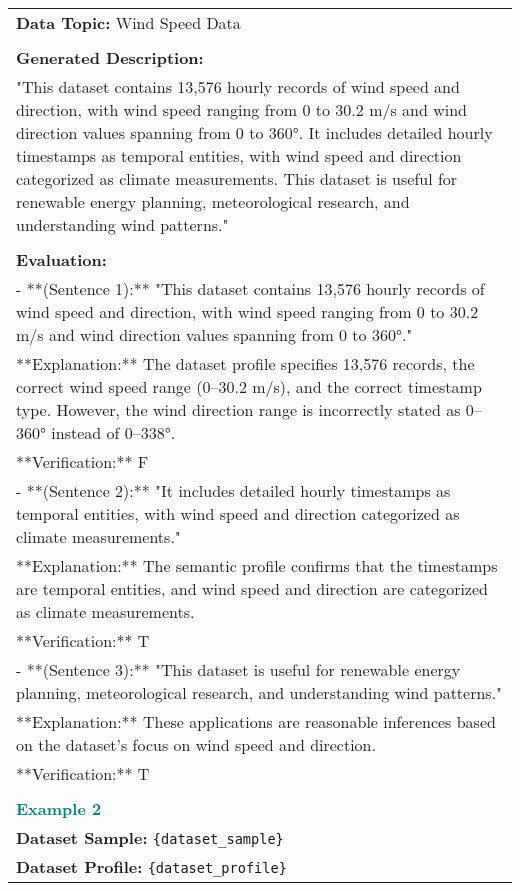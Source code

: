 \begin{table*}
\begin{tabular}{p{14cm}}
    \\
    \textbf{Data Topic:} Wind Speed Data \\
    \\
    \textbf{Generated Description:} \\
    "This dataset contains 13,576 hourly records of wind speed and direction, with wind speed ranging from 0 to 30.2 m/s and wind direction values spanning from 0 to 360°. It includes detailed hourly timestamps as temporal entities, with wind speed and direction categorized as climate measurements. This dataset is useful for renewable energy planning, meteorological research, and understanding wind patterns." \\
    \\
    \textbf{Evaluation:} \\
    - **(Sentence 1):** "This dataset contains 13,576 hourly records of wind speed and direction, with wind speed ranging from 0 to 30.2 m/s and wind direction values spanning from 0 to 360°." \\
      **Explanation:** The dataset profile specifies 13,576 records, the correct wind speed range (0–30.2 m/s), and the correct timestamp type. However, the wind direction range is incorrectly stated as 0–360° instead of 0–338°. \\
      **Verification:** F \\
    - **(Sentence 2):** "It includes detailed hourly timestamps as temporal entities, with wind speed and direction categorized as climate measurements." \\
      **Explanation:** The semantic profile confirms that the timestamps are temporal entities, and wind speed and direction are categorized as climate measurements. \\
      **Verification:** T \\
    - **(Sentence 3):** "This dataset is useful for renewable energy planning, meteorological research, and understanding wind patterns." \\
      **Explanation:** These applications are reasonable inferences based on the dataset's focus on wind speed and direction. \\
      **Verification:** T \\
    \\
    \textcolor{teal}{\textbf{Example 2}} \\
    \textbf{Dataset Sample:} \texttt{\{dataset\_sample\}} \\
    \textbf{Dataset Profile:} \texttt{\{dataset\_profile\}} \\

\end{tabular}
\end{table*}

